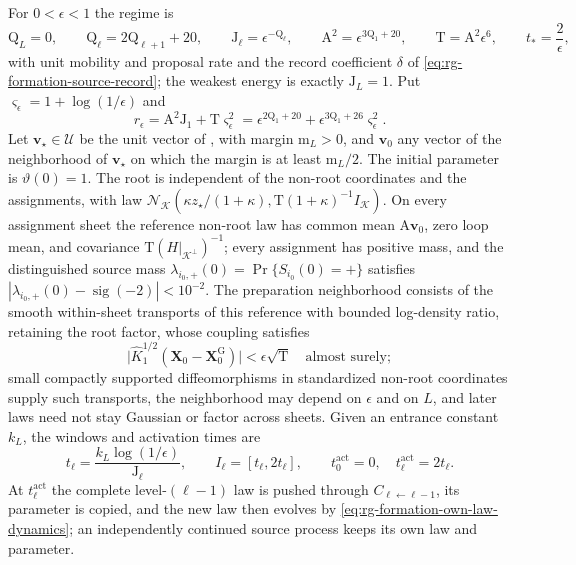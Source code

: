 For \(0<\epsilon<1\) the regime is
\begin{equation}
\mathrm Q_L=0,\qquad \mathrm Q_\ell=2\mathrm Q_{\ell+1}+20,\qquad
\mathrm J_\ell=\epsilon^{-\mathrm Q_\ell},\qquad
\mathrm A^2=\epsilon^{3\mathrm Q_1+20},\qquad
\mathrm T=\mathrm A^2\epsilon^6,\qquad t_*=\frac2\epsilon,
\label{eq:rg-formation-weakest-one-regime}
\end{equation}
with unit mobility and proposal rate and the record coefficient \(\delta\) of
\cref{eq:rg-formation-source-record}; the weakest energy is exactly
\(\mathrm J_L=1\). Put \(\varsigma_\epsilon=1+\log(1/\epsilon)\) and
\begin{equation}
r_\epsilon=\mathrm A^2\mathrm J_1+\mathrm T\varsigma_\epsilon^2
=\epsilon^{2\mathrm Q_1+20}+\epsilon^{3\mathrm Q_1+26}\varsigma_\epsilon^2.
\label{eq:rg-formation-parameter-remainder}
\end{equation}
Let \(\mathbf v_\star\in\mathcal U\) be the unit vector of
, with margin \(\mathrm m_L>0\), and
\(\mathbf v_0\) any vector of the neighborhood of \(\mathbf v_\star\) on which
the margin is at least \(\mathrm m_L/2\). The initial parameter is
\(\vartheta(0)=1\). The root is independent of the non-root coordinates and
the assignments, with law \(\mathcal N_{\mathcal K}(\kappa z_\star/(1+\kappa),
\mathrm T(1+\kappa)^{-1}I_{\mathcal K})\). On every assignment sheet the
reference non-root law has common mean \(\mathrm A\mathbf v_0\), zero loop
mean, and covariance \(\mathrm T(H|_{\mathcal K^\perp})^{-1}\); every
assignment has positive mass, and the
distinguished source mass \(\lambda_{i_0,+}(0)=\Pr\{S_{i_0}(0)=+\}\) satisfies
\(|\lambda_{i_0,+}(0)-\operatorname{sig}(-2)|<10^{-2}\). The preparation
neighborhood consists of the smooth within-sheet transports of this reference
with bounded log-density ratio, retaining the root factor, whose coupling
satisfies
\begin{equation}
\bigl|\widehat K_1^{1/2}(\mathbf X_0-\mathbf X_0^{\mathrm G})\bigr|
 <\epsilon\sqrt{\mathrm T}
\quad\text{almost surely};
\label{eq:rg-formation-preparation-transport}
\end{equation}
small compactly supported diffeomorphisms in standardized non-root coordinates
supply such transports, the neighborhood may depend on \(\epsilon\) and on
\(L\), and later laws need not stay Gaussian or factor across sheets. Given an
entrance constant \(k_L\), the windows and activation times are
\begin{equation}
t_\ell=\frac{k_L\log(1/\epsilon)}{\mathrm J_\ell},
\qquad I_\ell=[t_\ell,2t_\ell],\qquad
t^{\mathrm{act}}_0=0,\quad t^{\mathrm{act}}_\ell=2t_\ell.
\label{eq:rg-formation-activation-times}
\end{equation}
At \(t^{\mathrm{act}}_\ell\) the complete level-\((\ell-1)\) law is pushed
through \(C_{\ell\leftarrow\ell-1}\), its parameter is copied, and the new law
then evolves by \cref{eq:rg-formation-own-law-dynamics}; an independently
continued source process keeps its own law and parameter.

